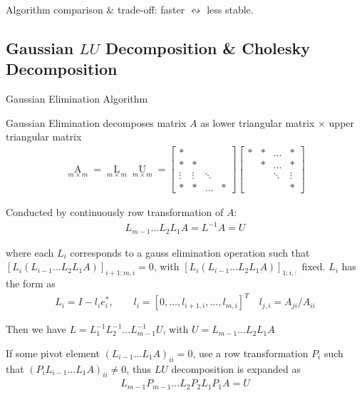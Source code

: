     Algorithm comparison \& trade-off: faster $ \leftrightsquigarrow $ less stable.



\subsection{Gaussian $ LU $ Decomposition \& Cholesky Decomposition}
\begin{point}
    Gaussian Elimination Algorithm
\end{point}

    Gaussian Elimination decomposes matrix $ A $ as lower triangular matrix $ \times $ upper triangular matrix
    \begin{align}
        \mathop{A}\limits_{m\times m}=\mathop{L}\limits_{m\times m}\mathop{U}\limits_{m\times m}  =
        \begin{bmatrix}
            *&&&\\
            *&*&&\\
            \vdots&\vdots&\ddots&\\
            *&*&\ldots&*
        \end{bmatrix}
        \begin{bmatrix}
            *&*&\ldots &*\\
            &*&\ldots&*\\
            &&\ddots&\vdots\\
            &&&*
        \end{bmatrix}  
    \end{align}
    
    Conducted by continuously row transformation of $ A $:
    \begin{align}
        L_{m-1}\ldots L_2L_1A=L^{-1}A=U 
    \end{align}
    
    where each $ L_i $ corresponds to a gauss elimination operation such that $ \left[L_i(L_{i-1}\ldots L_2L_1A)\right]_{i+1:m,i}=0 $, with $\left[L_i(L_{i-1}\ldots L_2L_1A)\right]_{1:i,:} $ fixed. $ L_i $ has the form as 
    \begin{align}
        L_i=I-l_ie_i^*,\qquad l_i=[0,\ldots,l_{i+1,i},\ldots,l_{m,i}]^T\quad l_{j,i}=A_{ji}/A_{ii}
    \end{align}
    
    Then we have $ L=L_1^{-1}L_2^{-1}\ldots L_{m-1}^{-1}U $, with $ U=L_{m-1}\ldots L_2L_1A $

    If some pivot element $ (L_{i-1}\ldots L_1A)_{ii}=0 $, use a row transformation $ P_i $ such that $ (P_iL_{i-1}\ldots L_1A)_{ii}\neq 0 $, thus $ LU $ decomposition is expanded as 
    \begin{align}
        L_{m-1}P_{m-1}\ldots L_2P_2L_1P_1A=U
    \end{align}


